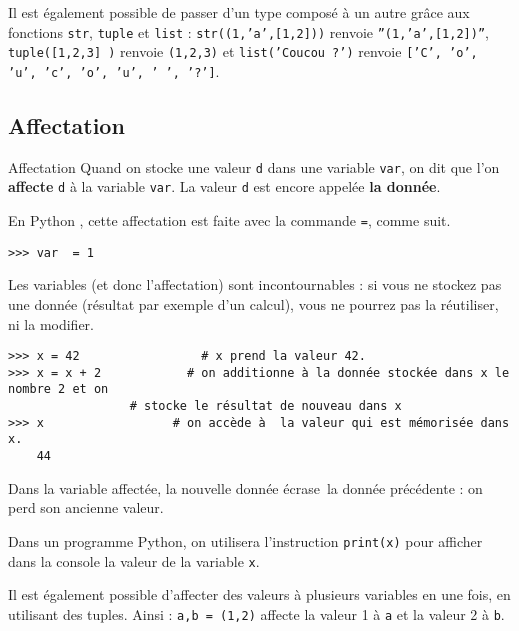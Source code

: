 Il est également possible de passer d'un type composé à un autre grâce aux fonctions \texttt{str}, 
\texttt{tuple} et \texttt{list} : \texttt{str((1,'a',[1,2]))} renvoie \texttt{''(1,'a',[1,2])''}, 
\texttt{tuple([1,2,3] )} renvoie \texttt{(1,2,3)} et \texttt{list('Coucou ?')} renvoie 
\texttt{['C', 'o', 'u', 'c', 'o', 'u', ' ', '?']}.

\subsection{Affectation}

\begin{defi}{Affectation}
Quand on stocke une valeur \texttt{d} dans une variable \texttt{var}, on dit que l'on 
\textbf{affecte} \texttt{d} à la variable \texttt{var}. La valeur
\texttt{d} est encore appelée \textbf{la donnée}.
\end{defi}

En Python , cette affectation est faite avec la commande \texttt{=}, comme suit.  

\begin{lstlisting}
>>> var  = 1
\end{lstlisting}


Les variables (et donc l'affectation) sont incontournables : si vous ne stockez pas une donnée 
(résultat par exemple d'un calcul), vous ne pourrez pas la réutiliser, ni la modifier.

\begin{lstlisting}
>>> x = 42                 # x prend la valeur 42.
>>> x = x + 2	         # on additionne à la donnée stockée dans x le nombre 2 et on 
                 # stocke le résultat de nouveau dans x 
>>> x                  # on accède à  la valeur qui est mémorisée dans x.
	44
\end{lstlisting}

Dans la variable affectée, la nouvelle donnée \og écrase\fg\ la donnée précédente : on perd son 
ancienne valeur.

Dans un programme Python, on utilisera l'instruction \texttt{print(x)}
pour afficher dans la console la valeur de la variable \texttt{x}.

Il est également possible d'affecter des valeurs à plusieurs variables en une fois, en utilisant 
des tuples. Ainsi : \texttt{a,b = (1,2)} affecte la valeur 1 à \texttt{a} et la valeur 2 à 
\texttt{b}.


